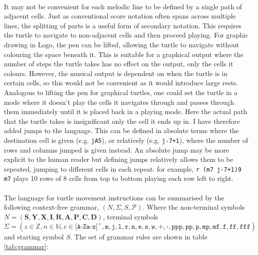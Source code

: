 \paragraph{} It may not be convenient for each melodic line to be defined by a single path of adjacent cells. Just as conventional score notation often spans across multiple lines, the splitting of parts is a useful form of secondary notation. This requires the turtle to navigate to non-adjacent cells and then proceed playing. For graphic drawing in Logo, the pen can be lifted, allowing the turtle to navigate without colouring the space beneath it. This is suitable for a graphical output where the number of steps the turtle takes has no effect on the output, only the cells it colours. However, the musical output is dependent on when the turtle is in certain cells, so this would not be convenient as it would introduce large rests. Analogous to lifting the pen for graphical turtles, one could set the turtle in a mode where it doesn't play the cells it navigates through and passes through them immediately until it is placed back in a playing mode. Here the actual path that the turtle takes is insignificant only the cell it ends up in. I have therefore added jumps to the language. This can be defined in absolute terms where the destination cell is given (e.g. \texttt{jA5}), or relatively (e.g. \texttt{j-7+1}), where the number of rows and columns jumped is given instead. An absolute jump may be more explicit to the human reader but defining jumps relatively allows them to be repeated, jumping to different cells in each repeat. for example, \texttt{r (m7 j-7+1)9 m7} plays 10 rows of 8 cells from top to bottom playing each row left to right.

\paragraph{} The language for turtle movement instructions can be summarised by the following context-free grammar, $(N,\Sigma,S,\mathcal{P})$. Where the non-terminal symbols $N=(\mathbf{S}, \mathbf{Y}, \mathbf{X}, \mathbf{I}, \mathbf{R}, \mathbf{A}, \mathbf{P}, \mathbf{C}, \mathbf{D})$, terminal symbols $\Sigma=(z{\in}\mathbb{Z}, n{\in}\mathbb{N}, c{\in}\texttt{[A-Za-z]}^{+}, \texttt{m}, \texttt{j}, \texttt{l}, \texttt{r}, \texttt{n}, \texttt{e}, \texttt{s}, \texttt{w}, \texttt{+}, \texttt{-}, \texttt{ppp}, \texttt{pp}, \texttt{p}, \texttt{mp}, \texttt{mf}, \texttt{f}, \texttt{ff}, \texttt{fff})$ and starting symbol $S$. The set of grammar rules are shown in table \ref{tab:grammar}:

